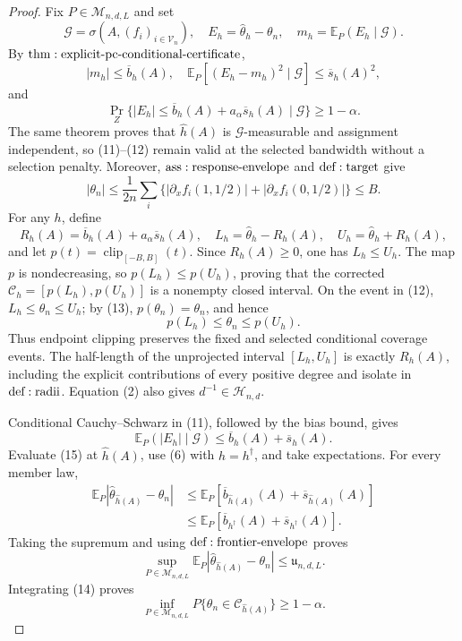 \documentclass{article}
\begin{document}
\begin{proof}
Fix \(P\in\mathcal M_{n,d,L}\) and set
\[
 \mathcal G=\sigma\!\left(A,(f_i)_{i\in\mathcal V_n}\right),
 \quad E_h=\widehat\theta_h-\theta_n,
 \quad m_h=\mathbb E_P(E_h\mid\mathcal G).
\tag{10}
\]
By \({\rm thm:explicit\text{-}pc\text{-}conditional\text{-}certificate}\),
\[
 |m_h|\leq\overline b_h(A),\quad
 \mathbb E_P[(E_h-m_h)^2\mid\mathcal G]\leq\overline s_h(A)^2,
\tag{11}
\]
and
\[
 \Pr_Z\{|E_h|\leq\overline b_h(A)+a_\alpha\overline s_h(A)\mid\mathcal G\}
 \geq1-\alpha.
\tag{12}
\]
The same theorem proves that \(\widehat h(A)\) is \(\mathcal G\)-measurable and assignment independent, so (11)--(12) remain valid at the selected bandwidth without a selection penalty.  Moreover, \({\rm ass:response\text{-}envelope}\) and \({\rm def:target}\) give
\[
 |\theta_n|\leq\frac1{2n}\sum_i
 \{ |\partial_xf_i(1,1/2)|+|\partial_xf_i(0,1/2)|\}\leq B.
\tag{13}
\]
For any \(h\), define
\[
 R_h(A)=\overline b_h(A)+a_\alpha\overline s_h(A),\quad
 L_h=\widehat\theta_h-R_h(A),\quad U_h=\widehat\theta_h+R_h(A),
\]
and let \(p(t)=\operatorname{clip}_{[-B,B]}(t)\).  Since \(R_h(A)\geq0\), one has \(L_h\leq U_h\).  The map \(p\) is nondecreasing, so \(p(L_h)\leq p(U_h)\), proving that the corrected \(\mathcal C_h=[p(L_h),p(U_h)]\) is a nonempty closed interval.  On the event in (12), \(L_h\leq\theta_n\leq U_h\); by (13), \(p(\theta_n)=\theta_n\), and hence
\[
 p(L_h)\leq\theta_n\leq p(U_h).
\tag{14}
\]
Thus endpoint clipping preserves the fixed and selected conditional coverage events.  The half-length of the unprojected interval \([L_h,U_h]\) is exactly \(R_h(A)\), including the explicit contributions of every positive degree and isolate in \({\rm def:radii}\).  Equation (2) also gives \(d^{-1}\in\mathcal H_{n,d}\).

Conditional Cauchy--Schwarz in (11), followed by the bias bound, gives
\[
 \mathbb E_P(|E_h|\mid\mathcal G)
 \leq\overline b_h(A)+\overline s_h(A).
\tag{15}
\]
Evaluate (15) at \(\widehat h(A)\), use (6) with \(h=h^\dagger\), and take expectations.  For every member law,
\[
\begin{aligned}
 \mathbb E_P|\widehat\theta_{\widehat h(A)}-\theta_n|
 &\leq\mathbb E_P[\overline b_{\widehat h(A)}(A)+\overline s_{\widehat h(A)}(A)]\\
 &\leq\mathbb E_P[\overline b_{h^\dagger}(A)+\overline s_{h^\dagger}(A)].
\end{aligned}
\tag{16}
\]
Taking the supremum and using \({\rm def:frontier\text{-}envelope}\) proves
\[
 \sup_{P\in\mathcal M_{n,d,L}}
 \mathbb E_P|\widehat\theta_{\widehat h(A)}-\theta_n|
 \leq\mathfrak u_{n,d,L}.
\tag{17}
\]
Integrating (14) proves
\[
 \inf_{P\in\mathcal M_{n,d,L}}
 P\{\theta_n\in\mathcal C_{\widehat h(A)}\}\geq1-\alpha.
\tag{18}
\]


\end{proof}
\end{document}

